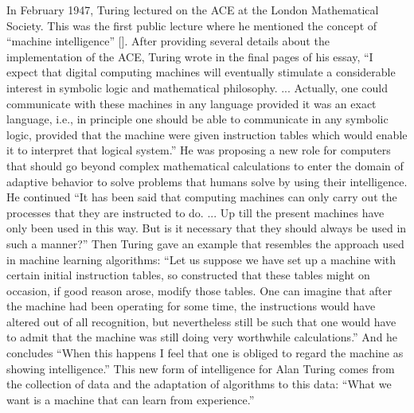 In February 1947, Turing lectured on the ACE at the London Mathematical Society. This was the first public lecture where he mentioned the concept of ``machine intelligence'' [\citealt{chap:4:Turing:1995}]. After providing several details about the implementation of the ACE, Turing wrote in the final pages of his essay, ``I expect that digital computing machines will eventually stimulate a considerable interest in symbolic logic and mathematical philosophy. ... Actually, one could communicate with these machines in any language provided it was an exact language, i.e., in principle one should be able to communicate in any symbolic logic, provided that the machine were given instruction tables which would enable it to interpret that logical system.'' He was proposing a new role for computers that should go beyond complex mathematical calculations to enter the domain of adaptive behavior to solve problems that humans solve by using their intelligence. He continued ``It has been said that computing machines can only carry out the processes that they are instructed to do. ... Up till the present machines have only been used in this way. But is it necessary that they should always be used in such a manner?'' Then Turing gave an example that resembles the approach used in machine learning algorithms: ``Let us suppose we have set up a machine with certain initial instruction tables, so constructed that these tables might on occasion, if good reason arose, modify those tables. One can imagine that after the machine had been operating for some time, the instructions would have altered out of all recognition, but nevertheless still be such that one would have to admit that the machine was still doing very worthwhile calculations.'' And he concludes ``When this happens I feel that one is obliged to regard the machine as showing intelligence.'' This new form of intelligence for Alan Turing comes from the collection of data and the adaptation of algorithms to this data: ``What we want is a machine that can learn from experience.''


